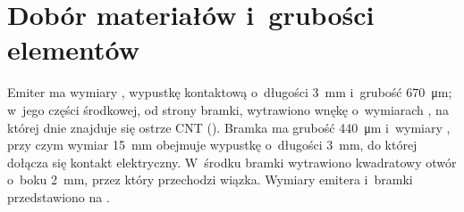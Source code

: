 \section{Dobór materiałów i~grubości elementów}
\label{sec:materialy}

Emiter ma wymiary
, wypustkę kontaktową o~długości
\SI{3}{\milli\metre} i~grubość \SI{670}{\micro\metre}; w~jego części środkowej, od strony bramki, wytrawiono
wnękę o~wymiarach ,
na której dnie znajduje się ostrze CNT ().
Bramka ma grubość \SI{440}{\micro\metre} i~wymiary
, przy czym
wymiar \SI{15}{\milli\metre} obejmuje wypustkę o~długości
\SI{3}{\milli\metre}, do której dołącza się kontakt elektryczny.
W~środku bramki wytrawiono kwadratowy otwór o~boku
\SI{2}{\milli\metre}, przez który przechodzi wiązka. Wymiary emitera
i~bramki przedstawiono na .

